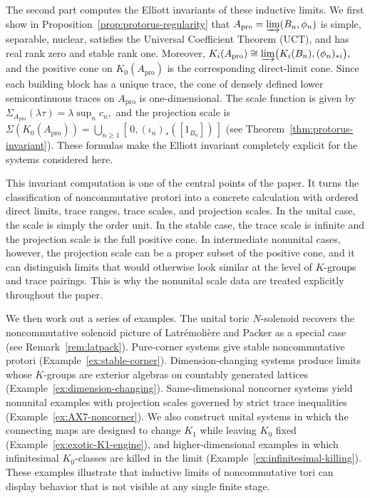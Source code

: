 \documentclass[11pt]{amsart}
\theoremstyle{definition}
\theoremstyle{remark}
\newcommand{\ex}{\mathrm{pro}}
\begin{document}
The second part computes the Elliott invariants of these inductive limits. We first show in Proposition~\ref{prop:protorus-regularity} that $A_{\ex}=\varinjlim(B_n,\phi_n)$ is simple, separable, nuclear, satisfies the Universal Coefficient Theorem (UCT), and
has real rank zero and stable rank one.  Moreover,
$K_i(A_{\ex}) \cong\varinjlim \bigl(K_i(B_n),(\phi_n)_{*i}\bigr),$ and the positive cone on $K_0(A_{\ex})$ is the corresponding direct-limit cone. Since each
building block has a unique trace, the cone of densely defined lower
semicontinuous traces on $A_{\ex}$ is one-dimensional. The
scale function is given by $\Sigma_{A_{\ex}}(\lambda\tau)=\lambda\sup_n c_n,$
and the projection scale is $\Sigma(K_0(A_{\ex}))=\bigcup_{n\geq1}
[\,0,(\iota_n)_*([1_{B_n}])\,]$ (see Theorem~\ref{thm:protorus-invariant}). 
These formulas make the Elliott invariant completely explicit for the systems
considered here.

This invariant computation is one of the central points of the paper.  It
turns the classification of noncommutative protori into a concrete calculation
with ordered direct limits, trace ranges, trace scales, and projection scales.
In the unital case, the scale is simply the order unit.  In the stable case,
the trace scale is infinite and the projection scale is the full positive cone.
In intermediate nonunital cases, however, the projection scale can be a proper
subset of the positive cone, and it can distinguish limits that would otherwise
look similar at the level of $K$-groups and trace pairings.  This is why the
nonunital scale data are treated explicitly throughout the paper.

We then work out a series of examples.  The unital toric $N$-solenoid recovers
the noncommutative solenoid picture of Latr\'emoli\`ere and Packer as a special
case (see Remark~\ref{rem:latpack}).  Pure-corner systems give stable noncommutative protori (Example~\ref{ex:stable-corner}). Dimension-changing
systems produce limits whose $K$-groups are exterior algebras on countably
generated lattices (Example~\ref{ex:dimension-changing}).  Same-dimensional noncorner systems yield nonunital
examples with projection scales governed by strict trace inequalities (Example~\ref{ex:AX7-noncorner}).  We also
construct unital systems in which the connecting maps are designed to change
$K_1$ while leaving $K_0$ fixed (Example~\ref{ex:exotic-K1-engine}), and higher-dimensional examples in which
infinitesimal $K_0$-classes are killed in the limit (Example~\ref{ex:infinitesimal-killing}).  These examples illustrate
that inductive limits of noncommutative tori can display behavior that is not
visible at any single finite stage.
\end{document}
